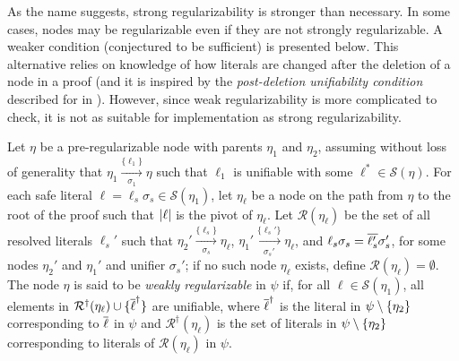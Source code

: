 As the name suggests, strong regularizability is stronger than necessary. In some cases, nodes may be regularizable even if they are not strongly regularizable. A weaker condition (conjectured to be sufficient) is presented below. This alternative relies on knowledge of how literals are changed after the deletion of a node in a proof (and it is inspired by the \emph{post-deletion unifiability condition} described for {\FOLowerUnits} in \cite{GFOLU}). However, since weak regularizability is more complicated to check, it is not as suitable for implementation as strong regularizability.
\begin{definition}\label{def:postdelprop}
Let $\eta$ be a pre-regularizable node with parents $\eta_1$ and $\eta_2$, assuming without loss of generality that $\eta_1 \xrightarrow[\sigma_1]{\{\ell_1\} } \eta$ 
such that $\ell_1$ is unifiable with some $\ell^* \in \mathcal{S}(\eta)$.
For each safe literal $\ell = \ell_s\sigma_s \in \mathcal{S}(\eta_1)$, let $\eta_\ell$ be a node on the path from $\eta$ to the root of the proof such that $\lvert\ell\rvert$ is the pivot of $\eta_\ell$.
Let $\mathcal{R}(\eta_\ell)$ be the set of all resolved literals $\ell_s'$ such that $\eta_2' \xrightarrow[\sigma_s]{\{\ell_s\} } \eta_\ell$, $\eta_1' \xrightarrow[\sigma_s']{\{\ell_s'\} } \eta_\ell$, and $\ell_s\sigma_s=\overline{\ell_s'}\sigma_s'$, for some nodes $\eta_2'$ and $\eta_1'$ and unifier $\sigma_s'$; if no such node $\eta_\ell$ exists, define $\mathcal{R}(\eta_\ell)=\emptyset$.
The node $\eta$ is said to be \emph{weakly regularizable} in $\psi$ if, for all $\ell \in \mathcal{S}(\eta_1)$, all elements in $\mathcal{R}^{\dagger}(\eta_\ell) \cup \{ \overline{\ell}^\dagger \}$ are unifiable, where $\overline{\ell}^{\dagger}$ is the literal in $\psi \setminus \{\eta_2\}$ corresponding to $\overline{\ell}$ in $\psi$ and $\mathcal{R}^{\dagger}(\eta_\ell)$ is the set of literals in $\psi \setminus \{\eta_2\}$ corresponding to literals of $\mathcal{R}(\eta_\ell)$ in $\psi$.
\end{definition}




